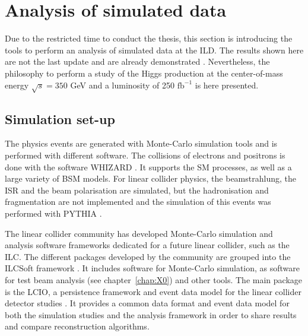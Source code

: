  

  \section{Analysis of simulated data}
  
    Due to the restricted time to conduct the thesis, this section is introducing the tools to perform an analysis of simulated data at the ILD. 
    The results shown here are not the last update and are already demonstrated \cite{Mueller}. 
    Nevertheless, the philosophy to perform a study of the Higgs production at the center-of-mass energy $\sqrt{s} = 350$ GeV and a luminosity of 250 $\text{fb}^{-1}$ is here presented.
  
  \subsection{Simulation set-up}  
  \label{subsec:ILCSOFT}

    The physics events are generated with Monte-Carlo simulation tools and is performed with different software.
    The collisions of electrons and positrons is done with the software WHIZARD \cite{WHIZARD}.
    It supports the \gls{SM} processes, as well as a large variety of BSM models.
    For linear collider physics, the beamstrahlung, the \gls{ISR} and the beam polarisation are simulated, but the hadronisation and fragmentation are not implemented and the simulation of this events was performed with PYTHIA \cite{PYTHIA}.
  
    The linear collider community has developed Monte-Carlo simulation and analysis software frameworks dedicated for a future linear collider, such as the \gls{ILC}. 
    The different packages developed by the community are grouped into the ILCSoft framework \cite{ilcsoft}.
    It includes software for Monte-Carlo simulation, as software for test beam analysis (see chapter~\ref{chap:X0}) and other tools.
    The main package is the \gls{LCIO}, a persistence framework and event data model for the linear collider detector studies \cite{lcio}. 
    It provides a common data format and event data model for both the simulation studies and the analysis framework in order to share results and compare reconstruction algorithms.

